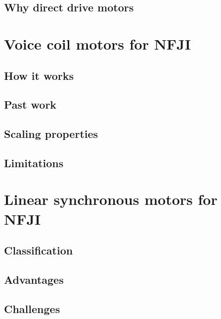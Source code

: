 \subsection{Why direct drive motors}            \label{Chapter:background/needle-free jet injection/why direct drive}


\section{Voice coil motors for NFJI}            \label{Chapter:background/voice coil motors for NFJI}
\subsection{How it works}                       \label{Chapter:background/voice coil motors for NFJI/how it works}
\subsection{Past work}                          \label{Chapter:background/voice coil motors for NFJI/past work}
\subsection{Scaling properties}                 \label{Chapter:background/voice coil motors for NFJI/scaling properties}
\subsection{Limitations}                        \label{Chapter:background/voice coil motors for NFJI/Limitations}


\section{Linear synchronous motors for NFJI}    \label{Chapter:background/linear synchronous motors for NFJI}
\subsection{Classification}                     \label{Chapter:background/linear synchronous motors for NFJI/classification}
\subsection{Advantages}                         \label{Chapter:background/linear synchronous motors for NFJI/advantages}
\subsection{Challenges}                         \label{Chapter:background/linear synchronous motors for NFJI/challenges}
